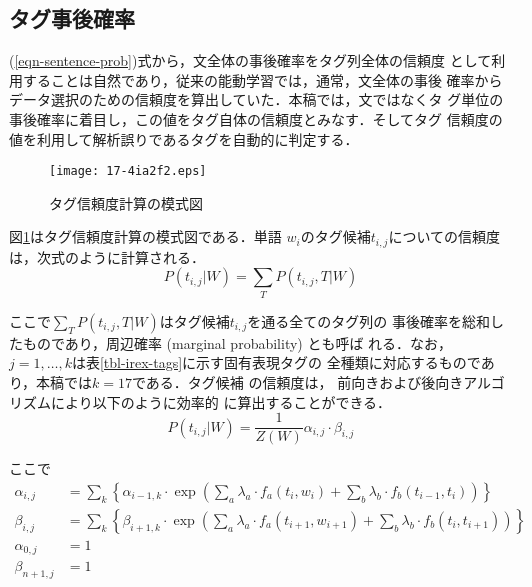\documentclass[japanese]{jnlp_1.4}
\begin{document}
\subsection{タグ事後確率}

(\ref{eqn-sentence-prob})式から，文全体の事後確率をタグ列全体の信頼度
として利用することは自然であり，従来の能動学習では，通常，文全体の事後
確率からデータ選択のための信頼度を算出していた．本稿では，文ではなくタ
グ単位の事後確率に着目し，この値をタグ自体の信頼度とみなす．そしてタグ
信頼度の値を利用して解析誤りであるタグを自動的に判定する．

\begin{figure}[b]
\begin{center}
\texttt{[image: 17-4ia2f2.eps]}
\end{center}
\caption{タグ信頼度計算の模式図}
\label{fig-confidence-measure}
\end{figure}


図\ref{fig-confidence-measure}はタグ信頼度計算の模式図である．単語
$w_i$のタグ候補$t_{i,j}$についての信頼度は，次式のように計算される．
\begin{equation}
P(t_{i,j}|W)  =  \sum_{T} P(t_{i,j},T|W)
\label{eqn-tag-prob}
\end{equation}

ここで$\sum_{T} P(t_{i,j},T|W)$はタグ候補$t_{i,j}$を通る全てのタグ列の
事後確率を総和したものであり，周辺確率 (marginal probability) とも呼ば
れる．なお，$j=1,\ldots,k$は表\ref{tbl-irex-tags}に示す固有表現タグの
全種類に対応するものであり，本稿では$k=17$である．タグ候補 の信頼度は，
前向きおよび後向きアルゴリズム\cite{FSNLP1999}により以下のように効率的
に算出することができる．
\begin{equation}
P(t_{i,j}|W)  =  \frac{1}{Z(W)} \alpha_{i,j} \cdot \beta_{i,j}
\end{equation}

ここで
{\allowdisplaybreaks
\begin{align}
\alpha_{i,j} & = 
\sum_{k} \left\{ \alpha_{i-1,k} \cdot \exp 
\left( \sum_{a} \lambda_{a} \cdot f_{a}(t_i,w_i) + 
\sum_{b} \lambda_{b} \cdot f_{b}(t_{i-1},t_{i}) \right) \right\} \\
\beta_{i,j} & = 
\sum_{k} \left\{ \beta_{i+1,k} \cdot \exp 
\left( \sum_{a} \lambda_{a} \cdot f_{a}(t_{i+1},w_{i+1}) + 
\sum_{b} \lambda_{b} \cdot f_{b}(t_{i},t_{i+1}) \right) \right\} \\
\alpha_{0,j} & = 1 \\
\beta_{n+1,j} & = 1
\end{align}
}
\end{document}
